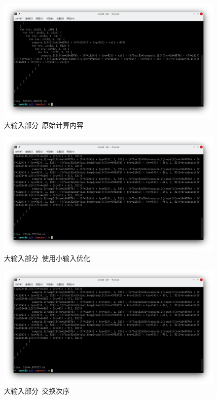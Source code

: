 \begin{figure}[H]
    \includegraphics[width=\textwidth]{images/orig2-1.png}
    \caption{大输入部分~原始计算内容}\label{2-1}
\end{figure}
\begin{figure}[H]
    \includegraphics[width=\textwidth]{images/orig2-2.png}
    \caption{大输入部分~使用小输入优化}\label{2-2}
\end{figure}
\begin{figure}[H]
    \includegraphics[width=\textwidth]{images/orig2-3.png}
    \caption{大输入部分~交换次序}\label{2-3}
\end{figure}
